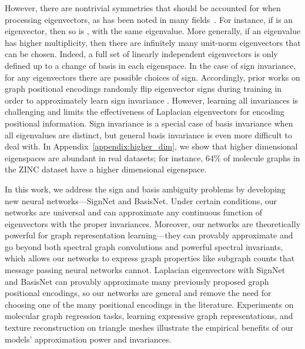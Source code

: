 \documentclass{article} \usepackage{iclr2023_conference,times}
\begin{document}
However, there are nontrivial symmetries that should be accounted for when processing eigenvectors, as has been noted in many fields~\citep{eastment1982cross, rustamov2007laplace, bro2008resolving, ovsjanikov2008global}. For instance, if  is an eigenvector, then so is , with the same eigenvalue. More generally, if an eigenvalue has higher multiplicity, then there are infinitely many unit-norm eigenvectors that can be chosen. Indeed, a full set of linearly independent eigenvectors is only defined up to a change of basis in each eigenspace. 
In the case of sign invariance, for any  eigenvectors there are  possible choices of sign. Accordingly, prior works on graph positional encodings randomly flip eigenvector signs during training in order to approximately learn sign invariance \citep{kreuzer2021rethinking, dwivedi2020benchmarking, kim2022pure}.  However, learning all  invariances is challenging and limits the effectiveness of Laplacian eigenvectors for encoding positional information. Sign invariance is a special case of basis invariance when all eigenvalues are distinct, but general basis invariance is even more difficult to deal with.
In Appendix~\ref{appendix:higher_dim}, we show that higher dimensional eigenspaces are abundant in real datasets; for instance, 64\% of molecule graphs in the ZINC dataset have a higher dimensional eigenspace.


In this work, we address the sign and basis ambiguity problems by developing new neural networks---SignNet and BasisNet.
Under certain conditions, our networks are universal and can approximate any continuous function of eigenvectors with the proper invariances.
Moreover, our networks are theoretically powerful for graph representation learning---they can provably approximate and go beyond both spectral graph convolutions and powerful spectral invariants, which allows our networks to express graph properties like subgraph counts that message passing neural networks cannot. Laplacian eigenvectors with SignNet and BasisNet can provably approximate many previously proposed graph positional encodings, so our networks are general and remove the need for choosing one of the many positional encodings in the literature.
Experiments on molecular graph regression tasks, learning expressive graph representations, and texture reconstruction on triangle meshes illustrate the empirical benefits of our models' approximation power and invariances. 
\end{document}
